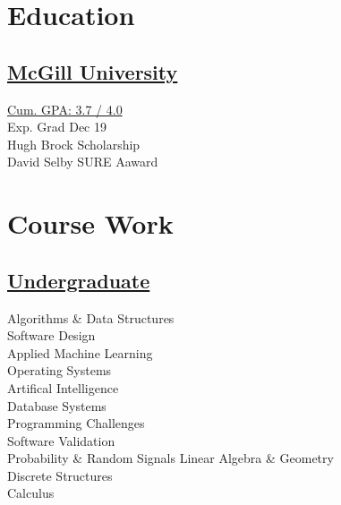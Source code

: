 \documentclass[]{sumbal-resume}
\begin{document}
\header

\begin{minipage}[t]{0.33\textwidth}



	\section{Education}
	\subsection{\href{http://www.abdullahsumbal.com/Doc/transcript.pdf}{McGill University}}
	\href{http://www.abdullahsumbal.com/Doc/transcript.pdf}{Cum. GPA: 3.7 / 4.0}\\
	Exp. Grad Dec 19 \\
	Hugh Brock Scholarship \\
	David Selby SURE Aaward
	\sectionsep

	\section{Course Work }
	\subsection{\href{http://www.abdullahsumbal.com/Doc/transcript.pdf}{Undergraduate}}
	Algorithms \& Data Structures \\
	Software Design \\
	Applied Machine Learning \\
	Operating Systems \\
	Artifical Intelligence \\
	Database Systems\\
	Programming Challenges \\
	Software Validation \\
	 Probability \& Random Signals
	Linear Algebra \& Geometry \\
	Discrete Structures \\
	Calculus \\
	\sectionsep


\end{minipage}
\end{document}
